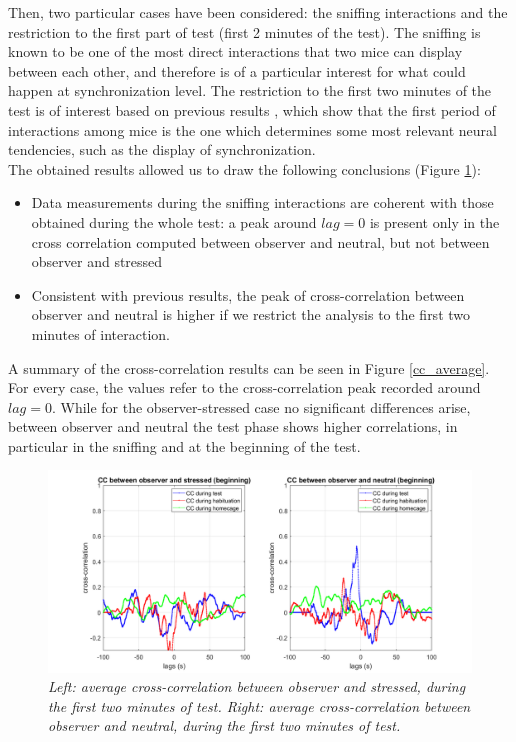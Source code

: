 \documentclass[12pt, a4paper]{report}
\begin{document}
Then, two particular cases have been considered: the sniffing interactions and the restriction to the first part of test (first 2 minutes of the test). The sniffing is known to be one of the most direct interactions that two mice can display between each other, and therefore is of a particular interest for what could happen at synchronization level. The restriction to the first two minutes of the test is of interest based on previous results \cite{16}, which show that the first period of interactions among mice is the one which determines some most relevant neural tendencies, such as the display of synchronization.\\
The obtained results allowed us to draw the following conclusions (Figure \ref{initial}):

\begin{itemize}
	\item Data measurements during the sniffing interactions are coherent with those obtained during the whole test: a peak around $lag=0$ is present only in the cross correlation computed between observer and neutral, but not between observer and stressed
	
	\item Consistent with previous results, the peak of cross-correlation between observer and neutral is higher if we restrict the analysis to the first two minutes of interaction.
	
\end{itemize}

A summary of the cross-correlation results can be seen in Figure \ref{cc_average}. For every case, the values refer to the cross-correlation peak recorded around $lag=0$. While for the observer-stressed case no significant differences arise, between observer and neutral the test phase shows higher correlations, in particular in the sniffing and at the beginning of the test.



\begin{figure}[H]
	
	\begin{center}
		\hspace*{-1.4cm}
		\includegraphics[scale=.5]{average_cc_initial.png} 
	\end{center} 
	\caption{\textit{Left: average cross-correlation between observer and stressed, during the first two minutes of test. Right: average cross-correlation between observer and neutral, during the first two minutes of test.}}
	\label{initial}
\end{figure}
\end{document}
